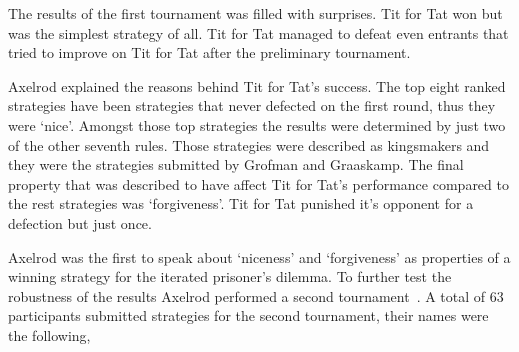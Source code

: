 \documentclass{article}
\begin{document}
The results of the first tournament was filled with surprises. Tit for Tat won 
but was the simplest strategy of all. Tit for Tat managed to defeat even
entrants that tried to improve on Tit for Tat after the preliminary tournament.

Axelrod explained the reasons behind Tit for Tat's success. The top eight ranked
strategies have been strategies that never defected on the first round, thus they were
`nice'. Amongst those top strategies the results were determined by just two 
of the other seventh rules. Those strategies were described as kingsmakers and they 
were the strategies submitted by Grofman and Graaskamp. The final property
that was described to have affect Tit for Tat's performance compared to the 
rest strategies was `forgiveness'. Tit for Tat punished it's opponent for a 
defection but just once.

Axelrod was the first to speak about `niceness' and `forgiveness' as properties
of a winning strategy for the iterated prisoner's dilemma. To further test the
robustness of the results Axelrod performed a second tournament~\cite{axelrod1980b}.
A total of 63 participants submitted strategies for the second tournament, 
their names were the following,
\end{document}
